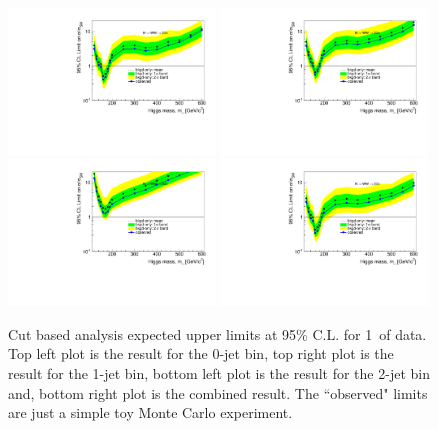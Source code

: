 \begin{figure}[!htbp]
\begin{center}
   \includegraphics[width=0.49\textwidth]{figures/limits_0j_1000pb_cut_1.pdf}
   \includegraphics[width=0.49\textwidth]{figures/limits_1j_1000pb_cut_1.pdf}
   \includegraphics[width=0.49\textwidth]{figures/limits_2j_1000pb_cut_1.pdf}
   \includegraphics[width=0.49\textwidth]{figures/limits_nj_1000pb_cut_1.pdf}
   \caption{Cut based analysis expected upper limits at 95\% C.L. for 1\ifb\ of data. Top left plot 
   is the result for the 0-jet bin, top right plot is the result for the 1-jet bin, bottom left plot 
   is the result for the 2-jet bin and, bottom right plot is the combined result. The ``observed" limits 
   are just a simple toy Monte Carlo experiment.}
   \label{fig:cutbase_uls}
\end{center}
\end{figure}

